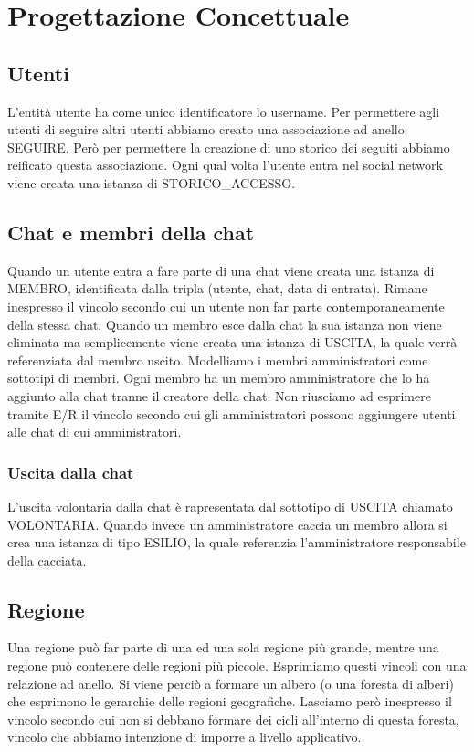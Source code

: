 \documentclass[a4paper,12pt]{report}
\begin{document}
\chapter{Progettazione Concettuale}
\section{Utenti}
L'entità utente ha come unico identificatore lo username. Per permettere agli utenti di seguire altri utenti abbiamo creato una associazione ad anello SEGUIRE. Però per permettere la creazione di uno storico dei seguiti abbiamo reificato questa associazione.
Ogni qual volta l'utente entra nel social network viene creata una istanza di STORICO\_ACCESSO. 

\section{Chat e membri della chat}
Quando un utente entra a fare parte di una chat viene creata una istanza di MEMBRO, identificata dalla tripla (utente, chat, data di entrata). Rimane inespresso il vincolo secondo cui un utente non far parte contemporaneamente della stessa chat. Quando un membro esce dalla chat la sua istanza non viene eliminata ma semplicemente viene creata una istanza di USCITA, la quale verrà referenziata dal membro uscito.
Modelliamo i membri amministratori come sottotipi di membri. Ogni membro ha un membro amministratore che lo ha aggiunto alla chat tranne il creatore della chat. Non riusciamo ad esprimere tramite E/R il vincolo secondo cui gli amministratori possono aggiungere utenti alle chat di cui amministratori.
\subsection{Uscita dalla chat}
L'uscita volontaria dalla chat è rapresentata dal sottotipo di USCITA chiamato VOLONTARIA. Quando invece un amministratore caccia un membro allora si crea una istanza di tipo ESILIO, la quale referenzia l'amministratore responsabile della cacciata.

\section{Regione}
Una regione può far parte di una ed una sola regione più grande, mentre una regione può contenere delle regioni più piccole. Esprimiamo questi vincoli con una relazione ad anello. Si viene perciò a formare un albero (o una foresta di alberi) che esprimono le gerarchie delle regioni geografiche. Lasciamo però inespresso il vincolo secondo cui non si debbano formare dei cicli all'interno di questa foresta, vincolo che abbiamo intenzione di imporre a livello applicativo. 
\end{document}

